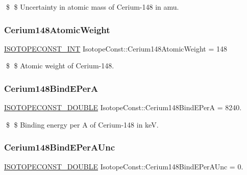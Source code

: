 \$ \$ Uncertainty in atomic mass of Cerium-\/148 in amu. \mbox{\label{group___isotope_const-_cerium-_ce148_ga01fac120fe86b7199db421fc123e778f}} 
\subsubsection{\texorpdfstring{Cerium148\+Atomic\+Weight}{Cerium148AtomicWeight}}
{\footnotesize\ttfamily \mbox{\hyperlink{group___isotope_const-_macros_ga5f18360b3e99483a35c32d789e62621c}{I\+S\+O\+T\+O\+P\+E\+C\+O\+N\+S\+T\+\_\+\+I\+NT}} Isotope\+Const\+::\+Cerium148\+Atomic\+Weight = 148}

\$ \$ Atomic weight of Cerium-\/148. \mbox{\label{group___isotope_const-_cerium-_ce148_ga64cc60d54f119a36913ac0b17c959d9d}} 
\subsubsection{\texorpdfstring{Cerium148\+Bind\+E\+PerA}{Cerium148BindEPerA}}
{\footnotesize\ttfamily \mbox{\hyperlink{group___isotope_const-_macros_ga8f45a7272ce02c0b4c65c44636ed719a}{I\+S\+O\+T\+O\+P\+E\+C\+O\+N\+S\+T\+\_\+\+D\+O\+U\+B\+LE}} Isotope\+Const\+::\+Cerium148\+Bind\+E\+PerA = 8240.}

\$ \$ Binding energy per A of Cerium-\/148 in keV. \mbox{\label{group___isotope_const-_cerium-_ce148_ga4d38b56a2c9f02d12f02c67aeb7eb92e}} 
\subsubsection{\texorpdfstring{Cerium148\+Bind\+E\+Per\+A\+Unc}{Cerium148BindEPerAUnc}}
{\footnotesize\ttfamily \mbox{\hyperlink{group___isotope_const-_macros_ga8f45a7272ce02c0b4c65c44636ed719a}{I\+S\+O\+T\+O\+P\+E\+C\+O\+N\+S\+T\+\_\+\+D\+O\+U\+B\+LE}} Isotope\+Const\+::\+Cerium148\+Bind\+E\+Per\+A\+Unc = 0.}

